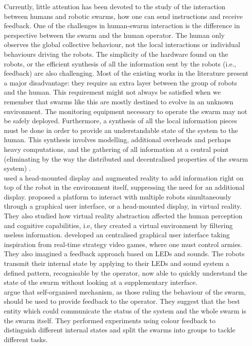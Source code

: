 \documentclass[oneside, a4paper, 12pt]{memoir}
\begin{document}
	Currently, little attention has been devoted to the study of the interaction between humans and robotic swarms, how one can send instructions and receive feedback. One of the challenges in human-swarm interaction is the difference in perspective between the swarm and the human operator. The human only observes the global collective behaviour, not the local interactions or individual behaviours driving the robots. The simplicity of the hardware found on the robots, or the efficient synthesis of all the information sent by the robots (i.e., feedback) are also challenging. Most of the existing works in the literature present a major disadvantage: they require an extra layer between the group of robots and the human. This requirement might not always be satisfied when we remember that swarms like this are mostly destined to evolve in an unknown environment. The monitoring equipment necessary to operate the swarm may not be safely deployed. Furthermore, a synthesis of all the local information pieces must be done in order to provide an understandable state of the system to the human. This synthesis involves modelling, additional overheads and perhaps heavy computations, and the gathering of all information at a central point (eliminating by the way the distributed and decentralised properties of the swarm system) \citep{podevijn2012self}.\\
	\citet{daily2003world} used a head-mounted display and augmented reality to add information right on top of the robot in the environment itself, suppressing the need for an additional display. \citet{baizid2009human} proposed a platform to interact with multiple robots simultaneously through a graphical user interface, or a head-mounted display, in virtual reality. They also studied how virtual reality abstraction affected the human perception and cognitive capabilities, i.e, they created a virtual environment by filtering useless information. \citet{mclurkin2006speaking} developed an centralised graphical user interface taking inspiration from real-time strategy video games, where one must control armies. They also imagined a feedback approach based on LEDs and sounds. The robots transmit their internal state by applying to their LEDs and sound system a defined pattern, recognisable by the operator, now able to quickly understand the state of the swarm without looking at a supplementary interface.\\
	\citet{podevijn2012self} argue that self-organised mechanism, as those ruling the behaviour of the swarm, should be used to provide feedback to the operator. They suggest that the best entity which could communicate the status of the system and the whole swarm is the swarm itself. They performed experiments using colour feedback to distinguish different internal states and split the swarms into groups to tackle different tasks.
	
\end{document}
